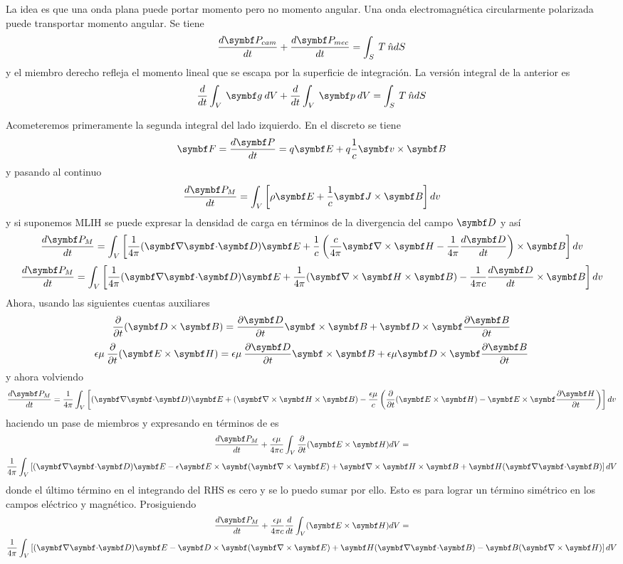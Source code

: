 \documentclass[10pt,oneside]{CBFT_book}
\begin{document}
La idea es que una onda plana puede portar momento pero no momento angular.
Una onda electromagnética circularmente polarizada puede transportar momento angular.
Se tiene
\[
	\dtot{\vb{P}_{cam}}{t} + \dtot{\vb{P}_{mec}}{t} = \int_S \: T \: \hat{n} dS
\]
y el miembro derecho refleja el momento lineal que se escapa por la superficie de
integración.
La versión integral de la anterior es
\[
	\dtot{}{t} \int_V \: \vb{g} \: dV + \dtot{}{t} \int_V \: \vb{p} \: dV = \int_S \: T \: \hat{n} dS
\]

Acometeremos primeramente la segunda integral del lado izquierdo.
En el discreto se tiene
\[
	\vb{F} = \dtot{\vb{P}}{t} = q\vb{E} + q\frac{1}{c} \pv{v}{B} 
\]
y pasando al continuo
\[
	\dtot{\vb{P}_M}{t} = \int_V \left[ \rho\vb{E} + \frac{1}{c} \pv{J}{B}  \right] dv
\]
y si suponemos MLIH se puede expresar la densidad de carga en términos de la divergencia
del campo $\vb{D}$ y así
\[
	\dtot{\vb{P}_M}{t} = \int_V \left[ \frac{1}{4\pi} (\divem{D}) \vb{E} + 
	\frac{1}{c} \left( \frac{c}{4\pi}\rotorm{H} - \frac{1}{4\pi}\dtot{\vb{D}}{t} \right) 
	\times \vb{B} \right] dv
\]
\[
	\dtot{\vb{P}_M}{t} = \int_V \left[ \frac{1}{4\pi} (\divem{D}) \vb{E} +  
	\frac{1}{4\pi} (\Nabla\times\vb{H}\times\vb{B}) - \frac{1}{4\pi c}\dtot{\vb{D}}{t} 
	\times \vb{B} \right] dv
\]
Ahora, usando las siguientes cuentas auxiliares
\[
	\dpar{}{t}(\pv{D}{B}) = \dpar{\vb{D}}{t}\pv{}{B} + \pv{D}{}\dpar{\vb{B}}{t}
\]
\[
	\epsilon\mu \: \dpar{}{t}(\pv{E}{H}) = \epsilon\mu \: \dpar{\vb{D}}{t}\pv{}{B} + 
	\epsilon\mu\pv{D}{}\dpar{\vb{B}}{t}
\]
y ahora volviendo
\[
	\dtot{\vb{P}_M}{t} = \frac{1}{4\pi} \int_V \left[  (\divem{D}) \vb{E} + (\Nabla\times\vb{H}\times\vb{B}) 
	-\frac{\epsilon\mu}{c} \left( \dpar{}{t}(\pv{E}{H}) - \pv{E}{}\dpar{\vb{H}}{t} \right) \right] dv	
\]
haciendo un pase de miembros y expresando  en términos de  es
\begin{multline*}
	\dtot{\vb{P}_M}{t} + \frac{\epsilon\mu }{4\pi c} \int_V \dpar{}{t}(\pv{E}{H}) dV = \\
	\frac{1}{4\pi} \int_V \left[  (\divem{D}) \vb{E} - \epsilon \pv{E}{}(\Nabla\times\vb{E}) +
	\rotorm{H}\times\vb{B} + \vb{H}(\divem{B}) \right] dV	 
\end{multline*}
donde el último término en el integrando del RHS es cero y se lo puedo sumar por ello.
Esto es para lograr un término simétrico en los campos eléctrico y magnético.
Prosiguiendo
\begin{multline*}
	\dtot{\vb{P}_M}{t} + \frac{\epsilon\mu }{4\pi c} \dtot{}{t}\int_V (\pv{E}{H}) dV = \\
	\frac{1}{4\pi} \int_V \left[  (\divem{D}) \vb{E} - \pv{D}{}(\Nabla\times\vb{E}) +
	\vb{H}(\divem{B}) - \vb{B}(\rotorm{H}) \right] dV	
\end{multline*}
\end{document}
